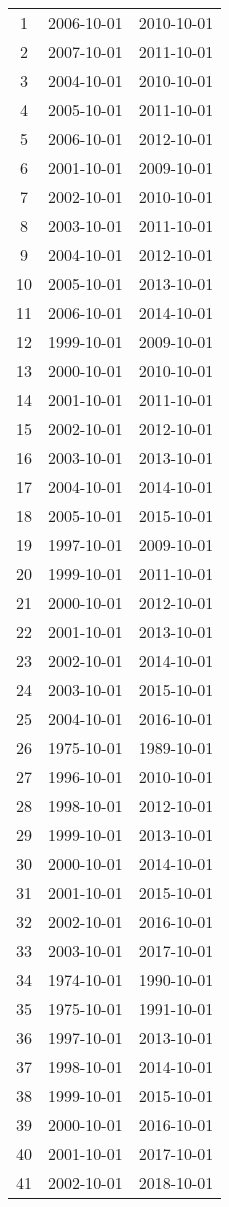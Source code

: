 % 
\begin{tabular}{ccc}
  \hline
  \hline
1 & 2006-10-01 & 2010-10-01 \\ 
  2 & 2007-10-01 & 2011-10-01 \\ 
  3 & 2004-10-01 & 2010-10-01 \\ 
  4 & 2005-10-01 & 2011-10-01 \\ 
  5 & 2006-10-01 & 2012-10-01 \\ 
  6 & 2001-10-01 & 2009-10-01 \\ 
  7 & 2002-10-01 & 2010-10-01 \\ 
  8 & 2003-10-01 & 2011-10-01 \\ 
  9 & 2004-10-01 & 2012-10-01 \\ 
  10 & 2005-10-01 & 2013-10-01 \\ 
  11 & 2006-10-01 & 2014-10-01 \\ 
  12 & 1999-10-01 & 2009-10-01 \\ 
  13 & 2000-10-01 & 2010-10-01 \\ 
  14 & 2001-10-01 & 2011-10-01 \\ 
  15 & 2002-10-01 & 2012-10-01 \\ 
  16 & 2003-10-01 & 2013-10-01 \\ 
  17 & 2004-10-01 & 2014-10-01 \\ 
  18 & 2005-10-01 & 2015-10-01 \\ 
  19 & 1997-10-01 & 2009-10-01 \\ 
  20 & 1999-10-01 & 2011-10-01 \\ 
  21 & 2000-10-01 & 2012-10-01 \\ 
  22 & 2001-10-01 & 2013-10-01 \\ 
  23 & 2002-10-01 & 2014-10-01 \\ 
  24 & 2003-10-01 & 2015-10-01 \\ 
  25 & 2004-10-01 & 2016-10-01 \\ 
  26 & 1975-10-01 & 1989-10-01 \\ 
  27 & 1996-10-01 & 2010-10-01 \\ 
  28 & 1998-10-01 & 2012-10-01 \\ 
  29 & 1999-10-01 & 2013-10-01 \\ 
  30 & 2000-10-01 & 2014-10-01 \\ 
  31 & 2001-10-01 & 2015-10-01 \\ 
  32 & 2002-10-01 & 2016-10-01 \\ 
  33 & 2003-10-01 & 2017-10-01 \\ 
  34 & 1974-10-01 & 1990-10-01 \\ 
  35 & 1975-10-01 & 1991-10-01 \\ 
  36 & 1997-10-01 & 2013-10-01 \\ 
  37 & 1998-10-01 & 2014-10-01 \\ 
  38 & 1999-10-01 & 2015-10-01 \\ 
  39 & 2000-10-01 & 2016-10-01 \\ 
  40 & 2001-10-01 & 2017-10-01 \\ 
  41 & 2002-10-01 & 2018-10-01 \\ 
   \hline
\end{tabular}
